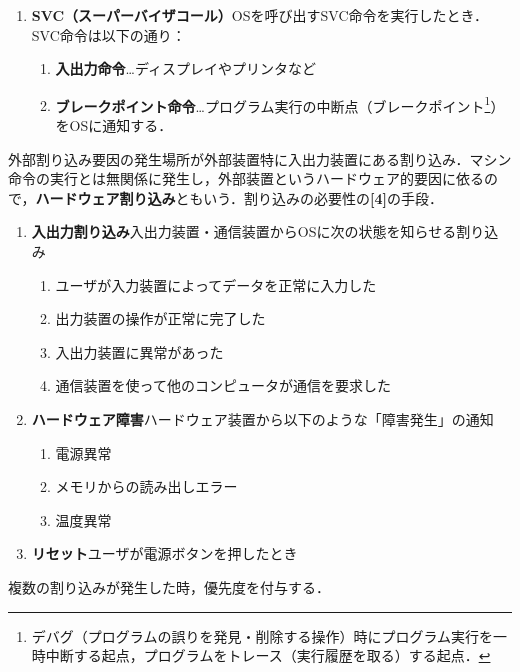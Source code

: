\begin{enumerate}[label=\textbf{[\Alph*]}, labelsep=10pt, leftmargin=23pt]
\begin{enumerate}[label=\textbf{(\arabic*)}, labelsep=10pt, leftmargin=23pt]
			\item \textbf{SVC（スーパーバイザコール）}\quad OSを呼び出すSVC命令を実行したとき．SVC命令は以下の通り：
				\begin{enumerate}[label={\color{gray}●}, labelsep=10pt, leftmargin=23pt]
					\item \textbf{入出力命令}…ディスプレイやプリンタなど
					\item \textbf{ブレークポイント命令}…プログラム実行の中断点（ブレークポイント\footnote{デバグ（プログラムの誤りを発見・削除する操作）時にプログラム実行を一時中断する起点，プログラムをトレース（実行履歴を取る）する起点．}）をOSに通知する．
				\end{enumerate}
		\end{enumerate}
	\item 外部割り込み\quad 要因の発生場所が外部装置特に入出力装置にある割り込み．マシン命令の実行とは無関係に発生し，外部装置というハードウェア的要因に依るので，\textbf{ハードウェア割り込み}ともいう．割り込みの必要性の\textbf{[4]}の手段．
		\begin{enumerate}[label=\textbf{(\arabic*)}, labelsep=10pt, leftmargin=23pt]
			\item \textbf{入出力割り込み}\quad 入出力装置・通信装置からOSに次の状態を知らせる割り込み
				\begin{enumerate}[label=\textbf{(\roman*)}, labelsep=10pt, leftmargin=23pt]
					\item ユーザが入力装置によってデータを正常に入力した
					\item 出力装置の操作が正常に完了した
					\item 入出力装置に異常があった
					\item 通信装置を使って他のコンピュータが通信を要求した
				\end{enumerate}
			\item \textbf{ハードウェア障害}\quad ハードウェア装置から以下のような「障害発生」の通知
				\begin{enumerate}[label=\textbf{(\roman*)}, labelsep=10pt, leftmargin=23pt]
					\item 電源異常
					\item メモリからの読み出しエラー
					\item 温度異常
				\end{enumerate}
			\item \textbf{リセット}\quad ユーザが電源ボタンを押したとき
		\end{enumerate}
\end{enumerate}

複数の割り込みが発生した時，優先度を付与する．

